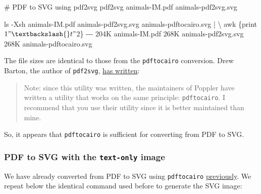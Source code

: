 \documentclass[
  11pt,
  british,
  a4paper,
]{article}
\newenvironment{Shaded}{\begin{snugshade}}{\end{snugshade}}
\newcommand{\AttributeTok}[1]{\textcolor[rgb]{0.80,0.80,0.80}{#1}}
\newcommand{\CommentTok}[1]{\textcolor[rgb]{0.50,0.62,0.50}{#1}}
\newcommand{\DataTypeTok}[1]{\textcolor[rgb]{0.87,0.87,0.75}{#1}}
\newcommand{\ExtensionTok}[1]{\textcolor[rgb]{0.80,0.80,0.80}{#1}}
\newcommand{\FunctionTok}[1]{\textcolor[rgb]{0.94,0.94,0.56}{#1}}
\newcommand{\KeywordTok}[1]{\textcolor[rgb]{0.94,0.87,0.69}{#1}}
\newcommand{\NormalTok}[1]{\textcolor[rgb]{0.80,0.80,0.80}{#1}}
\newcommand{\StringTok}[1]{\textcolor[rgb]{0.80,0.58,0.58}{#1}}
\begin{document}
\begin{Shaded}
\begin{Highlighting}[]
\CommentTok{\# PDF to SVG using pdf2svg}
\ExtensionTok{pdf2svg}\NormalTok{ animals{-}IM.pdf animals{-}pdf2svg.svg}

\FunctionTok{ls} \AttributeTok{{-}Xsh}\NormalTok{ animals{-}IM.pdf animals{-}pdf2svg.svg animals{-}pdftocairo.svg }\KeywordTok{|} \DataTypeTok{\textbackslash{}}
\FunctionTok{awk} \StringTok{\textquotesingle{}\{print $1 "\textbackslash{}t" $2\}\textquotesingle{}}
\ExtensionTok{{-}{-}{-}}
\ExtensionTok{204K}\NormalTok{    animals{-}IM.pdf}
\ExtensionTok{268K}\NormalTok{    animals{-}pdf2svg.svg}
\ExtensionTok{268K}\NormalTok{    animals{-}pdftocairo.svg}
\end{Highlighting}
\end{Shaded}

The file sizes are identical to those from the \texttt{pdftocairo}
conversion. Drew Barton, the author of \texttt{pdf2svg},
\href{https://cityinthesky.co.uk/opensource/pdf2svg/}{has written}:

\begin{quote}
Note: since this utility was written, the maintainers of Poppler have
written a utility that works on the same principle: \texttt{pdftocairo}.
I recommend that you use their utility since it is better maintained
than mine.
\end{quote}

So, it appears that \texttt{pdftocairo} is sufficient for converting
from PDF to SVG.

\hypertarget{pdf-to-svg-with-the-text-only-image}{%
\subsubsection{\texorpdfstring{PDF to SVG with the \texttt{text-only}
image}{PDF to SVG with the text-only image}}\label{pdf-to-svg-with-the-text-only-image}}

We have already converted from PDF to SVG using \texttt{pdftocairo}
\protect\hyperlink{generating-an-svg-from-a-pdf}{previously}. We repeat
below the identical command used before to generate the SVG image:
\end{document}
